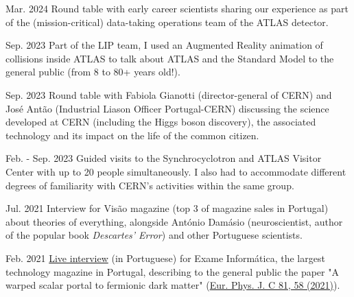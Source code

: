 
\begin{cventries}
    
    {}{Mar. 2024}
    {Round table with early career scientists sharing our experience as part of the (mission-critical) data-taking operations team of the ATLAS detector.}


    {}{Sep. 2023}
    {Part of the LIP team, I used an Augmented Reality animation of collisions inside ATLAS to talk about ATLAS and the Standard Model to the general public (from 8 to 80+ years old!).} 

    {}{Sep. 2023}
    {Round table with Fabiola Gianotti (director-general of CERN) and José Antão (Industrial Liason Officer Portugal-CERN) discussing the science developed at CERN (including the Higgs boson discovery), the associated technology and its impact on the life of the common citizen.}

    {}{Feb. - Sep. 2023}
    {Guided visits to the Synchrocyclotron and ATLAS Visitor Center with up to 20 people simultaneously. I also had to accommodate different degrees of familiarity with CERN's activities within the same group.}

    {}{Jul. 2021}
    {Interview for Visão magazine (top 3 of magazine sales in Portugal) about theories of everything, alongside António Damásio (neuroscientist, author of the popular book \textit{Descartes' Error}) and other Portuguese scientists.}


    {}{Feb. 2021}
    {\href{https://visao.pt/exameinformatica/videos-ei/eilive/2021-02-08-cromo-da-semana-novas-particulas-atomicas-e-a-quinta-dimensao/}{Live interview} (in Portuguese) for Exame Informática, the largest technology magazine in Portugal, describing to the general public the paper "A warped scalar portal to fermionic dark matter" (\href{https://doi.org/10.1140/epjc/s10052-021-08851-0}{Eur. Phys. J. C 81, 58 (2021)}). }


\end{cventries}
